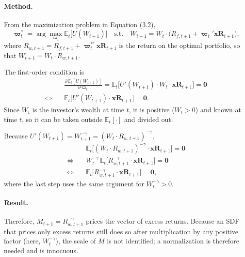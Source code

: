 \documentclass[11pt]{article}
\begin{document}
\paragraph{Method.}
From the maximization problem in Equation (3.2),
\[
  \bm{\varpi}^*_t = \arg\max_{\bm{\varpi}_t} \mathbb{E}_t\big[U(W_{t+1})\big]
  \quad \text{s.t.} \quad W_{t+1} = W_t \cdot \big(R_{f,t+1} + \bm{\varpi}_t' \mathbf{xR}_{t+1}\big),
\]
where $R_{w,t+1} = R_{f,t+1} + \bm{\varpi}^{*\prime}_t \mathbf{xR}_{t+1}$ is the return on the optimal
portfolio, so that $W_{t+1} = W_t \cdot R_{w,t+1}$.

The first-order condition is
\begin{align*}
  & \frac{\partial\, \mathbb{E}_t[U(W_{t+1})]}{\partial \bm{\varpi}_t}
    = \mathbb{E}_t\big[U'(W_{t+1}) \cdot W_t \cdot \mathbf{xR}_{t+1}\big] = \mathbf{0} \\
  \Longleftrightarrow\quad
  & \mathbb{E}_t\big[U'(W_{t+1}) \cdot \mathbf{xR}_{t+1}\big] = \mathbf{0}.
\end{align*}
Since $W_t$ is the investor's wealth at time $t$, it is positive ($W_t > 0$) and known at time $t$,
so it can be taken outside $\mathbb{E}_t[\cdot]$ and divided out.

Because $U'(W_{t+1}) = W_{t+1}^{-\gamma} = (W_t \cdot R_{w,t+1})^{-\gamma}$,
\begin{align*}
  & \mathbb{E}_t\big[(W_t \cdot R_{w,t+1})^{-\gamma} \cdot \mathbf{xR}_{t+1}\big] = \mathbf{0} \\
  \Longleftrightarrow\quad
  & W_t^{-\gamma}\, \mathbb{E}_t\big[R_{w,t+1}^{-\gamma} \cdot \mathbf{xR}_{t+1}\big] = \mathbf{0} \\
  \Longleftrightarrow\quad
  & \mathbb{E}_t\big[R_{w,t+1}^{-\gamma} \cdot \mathbf{xR}_{t+1}\big] = \mathbf{0},
\end{align*}
where the last step uses the same argument for $W_t^{-\gamma} > 0$.

\paragraph{Result.}
Therefore, $M_{t+1} = R_{w,t+1}^{-\gamma}$ prices the vector of excess returns. Because an SDF that
prices only excess returns still does so after multiplication by any positive factor (here,
$W_t^{-\gamma}$), the scale of $M$ is not identified; a normalization is therefore needed and is
innocuous.

\FloatBarrier
\end{document}
